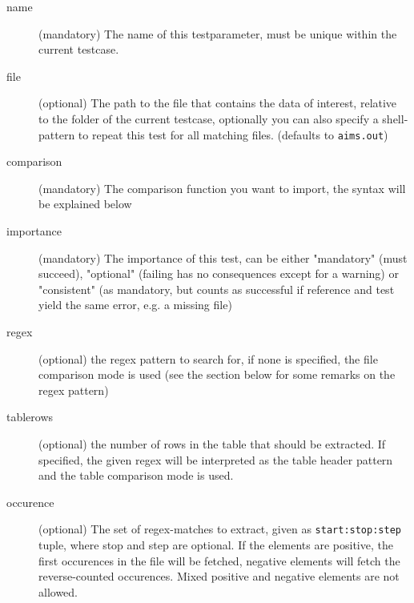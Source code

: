 \documentclass[a4paper,12pt]{scrartcl}
\begin{document}
\begin{description}
    \item[name] (mandatory) The name of this testparameter, must be unique within the current testcase.
    \item[file] (optional) The path to the file that contains the data of interest, relative to the folder of the
        current testcase, optionally you can also specify a shell-pattern to repeat this test for  all matching
        files. (defaults to \texttt{aims.out})
    \item[comparison] (mandatory) The comparison function you want to import, the syntax will be explained below
    \item[importance] (mandatory) The importance of this test, can be either "mandatory" (must succeed), "optional"
        (failing has no consequences except for a warning) or "consistent" (as mandatory, but counts as successful
        if reference and test yield the same error, e.g. a missing file)
    \item[regex] (optional) the regex pattern to search for, if none is specified, the file comparison mode is used
        (see the section below for some remarks on the regex pattern)
    \item[tablerows] (optional) the number of rows in the table that should be extracted. If specified, the given
        regex will be interpreted as the table header pattern and the table comparison mode is used.
    \item[occurence] (optional) The set of regex-matches to extract, given as \texttt{start:stop:step} tuple, where
        stop and step are optional. If the elements are positive, the first occurences in the file will be fetched,
        negative elements will fetch the reverse-counted occurences. Mixed positive and negative elements are not
        allowed.
\end{description}
\end{document}
